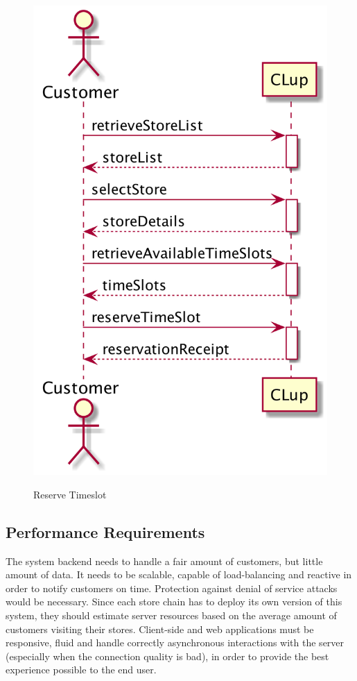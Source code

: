 \begin{figure}[H]
\begin{minipage}[b]{0.4\textwidth}
      \includegraphics[width=\textwidth]{uml/reserve_timeslot.png}
      \label{fig:seqdiag-reserve-timeslot}
      \caption{Reserve Timeslot}
    \end{minipage}
\end{figure}




\subsection{Performance Requirements}
The system backend needs to handle a fair amount of customers, but little amount of data. It needs to be scalable, capable of load-balancing and reactive in order to notify customers on time. Protection against denial of service attacks would be necessary.
Since each store chain has to deploy its own version of this system, they should estimate server resources based on the average amount of customers visiting their stores.
Client-side and web applications must be responsive, fluid and handle correctly asynchronous interactions with the server (especially when the connection quality is bad), in order to provide the best experience possible to the end user.

